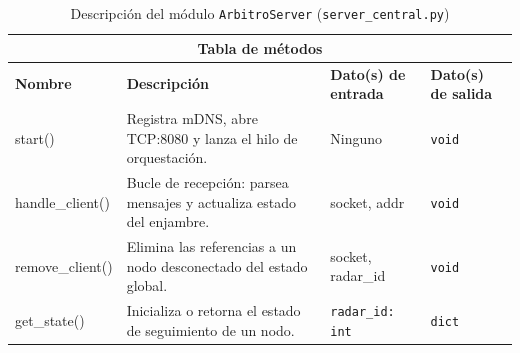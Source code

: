 \begin{table}[h!]
\begin{tabular}{|p{2.8cm}|p{5.5cm}|p{2.8cm}|p{1.7cm}|}
\hline
\multicolumn{4}{|c|}{\textbf{Tabla de métodos}} \\
\hline
\textbf{Nombre} & \textbf{Descripción} & \textbf{Dato(s) de entrada} & \textbf{Dato(s) de salida} \\
\hline
start() & Registra mDNS, abre TCP:8080 y lanza el hilo de orquestación. & Ninguno & \texttt{void} \\
\hline
handle\_client() & Bucle de recepción: parsea mensajes y actualiza estado del enjambre. & socket, addr & \texttt{void} \\
\hline
remove\_client() & Elimina las referencias a un nodo desconectado del estado global. & socket, radar\_id & \texttt{void} \\
\hline
get\_state() & Inicializa o retorna el estado de seguimiento de un nodo. & \texttt{radar\_id: int} & \texttt{dict} \\
\hline
\end{tabular}
\caption{Descripción del módulo \texttt{ArbitroServer} (\texttt{server\_central.py})}
\label{tab:module_arbitro}
\end{table}

